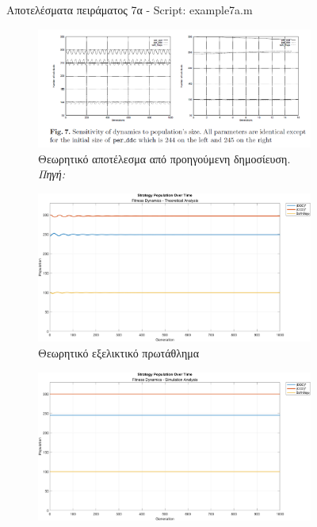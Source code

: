 \documentclass[12pt]{report}
\begin{document}
\begin{figure}[htbp]
\begin{subfigure}[b]{0.5\linewidth}
    \end{subfigure}

    \caption{Αποτελέσματα πειράματος 7α - \foreignlanguage{english}{Script: example7a.m}}
    \label{fig:fig_fit_7a}
\end{figure}

\begin{figure}[htbp]
    \centering

    \begin{subfigure}[b]{0.5\linewidth}
        \centering
        \includegraphics[width=\linewidth]{Figures Fitness Dynamics/7.png}
        \caption{Θεωρητικό αποτέλεσμα από προηγούμενη δημοσίευση. \textit{Πηγή:} \protect\cite{mathieu1999}}
    \end{subfigure}
    \hfill
    \begin{subfigure}[b]{0.5\linewidth}
        \centering
        \includegraphics[width=\linewidth]{Figures Fitness Dynamics/example7b.png}
        \caption{Θεωρητικό εξελικτικό πρωτάθλημα}
        \label{fig:fig_fit_7b_b}
    \end{subfigure}
    \hfill
    \begin{subfigure}[b]{0.5\linewidth}
        \centering
        \includegraphics[width=\linewidth]{Figures Fitness Dynamics/example7b-sim.png}

\end{subfigure}
\end{figure}
\end{document}
